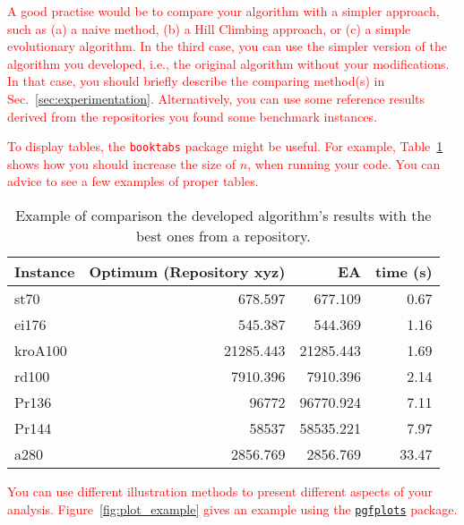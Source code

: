 \documentclass{scrartcl}
\begin{document}
\textcolor{red}{A good practise would be to compare your algorithm with a simpler approach, such as (a) a naive method, (b) a Hill Climbing approach, or (c) a simple evolutionary algorithm. In the third case, you can use the simpler version of the algorithm you developed, i.e., the original algorithm without your modifications. In that case, you should briefly describe the comparing method(s) in Sec.~\ref{sec:experimentation}. Alternatively, you can use some reference results derived from the repositories you found some benchmark instances.}

\textcolor{red}{To display tables, the \texttt{booktabs} package might be useful. For example, Table~\ref{tab:results_example} shows how you should increase the  size of $n$, when running your code. You can advice \cite{zobel2014graphs} to see a few examples of proper tables.}

\begin{table}[h]
\centering
\caption{Example of comparison the developed algorithm's results with the best ones from a repository.}
\label{tab:results_example}
	\begin{tabular}{lrrr}
	\toprule
	\textbf{Instance} & \textbf{Optimum (Repository xyz)} & \textbf{EA} & \textbf{time (s)}\\
	\midrule
	st70       &  678.597      & 677.109	& 0.67\\
	ei176      &  545.387      & 544.369	& 1.16\\
	kroA100    &  21285.443    & 21285.443	& 1.69\\
	rd100      &  7910.396     & 7910.396	& 2.14\\
	Pr136      &  96772        & 96770.924	& 7.11\\
	Pr144      &  58537        & 58535.221	& 7.97\\
	a280       &  2856.769     & 2856.769	& 33.47\\
	\bottomrule
	\end{tabular}
\end{table}

\textcolor{red}{You can use different illustration methods to present different aspects of your analysis. Figure~\ref{fig:plot_example} gives an example using the \href{https://www.overleaf.com/learn/latex/Pgfplots_package}{\texttt{pgfplots}} package.}
\end{document}
